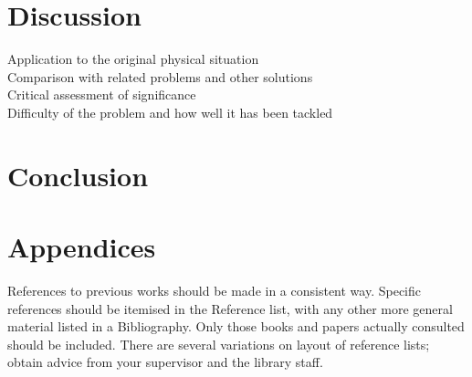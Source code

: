 \documentclass[a4paper,12pt]{article}
\begin{document}
\newpage

\section{Discussion}

Application to the original physical situation\\ 

Comparison with related problems and other solutions\\

Critical assessment of significance\\

Difficulty of the problem and how well it has been tackled\\

\cite{liuLiquidMetalMachine2016}

\newpage

\section{Conclusion}

\newpage

\section{Appendices}

\newpage
References to previous works should be made in a consistent way. Specific references should be itemised in the Reference list, with any other more general material listed in a Bibliography. Only those books and papers actually consulted should be included. There are several variations on layout of reference lists; obtain advice from your supervisor and the library staff.  

\printbibliography
	
\end{document}
